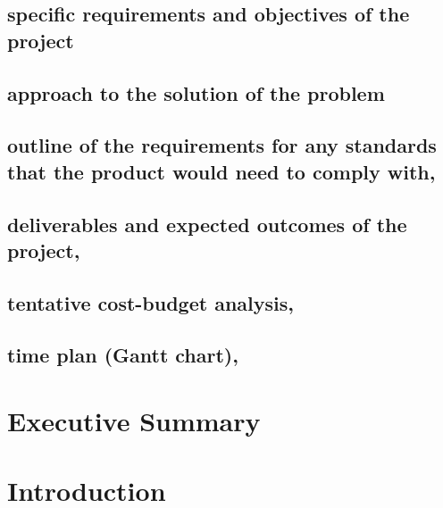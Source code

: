 \documentclass[a4paper,12pt]{article}
\begin{document}
\subsection{specific requirements and objectives of the project}


\subsection{approach to the solution of the problem}


\subsection{outline of the requirements for any standards that the product would need to comply with,}


\subsection{deliverables and expected outcomes of the project,}


\subsection{tentative cost-budget analysis,}

\subsection{time plan (Gantt chart),}



\section{Executive Summary}


\section{Introduction}
\end{document}
